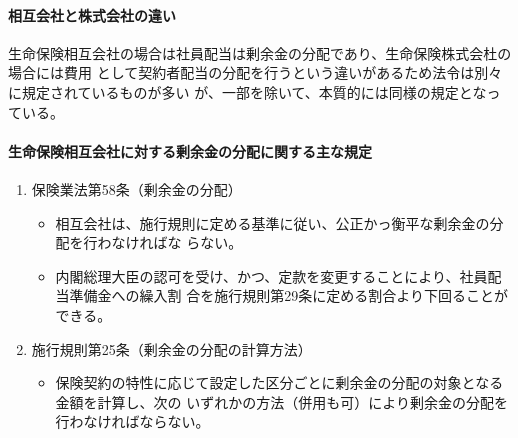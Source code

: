 \documentclass[report,gutter=10mm,fore-edge=10mm,uplatex,dvipdfmx]{jlreq}
\begin{document}
\paragraph{相互会社と株式会社の違い}
生命保険相互会社の場合は社員配当は剰余金の分配であり、生命保険株式会杜の場合には費用
として契約者配当の分配を行うという違いがあるため法令は別々に規定されているものが多い
が、一部を除いて、本質的には同様の規定となっている。

\paragraph{生命保険相互会社に対する剰余金の分配に関する主な規定}

\begin{enumerate} [＊]
\item 保険業法第58条（剰余金の分配）
\begin{itemize}
 \item 相互会社は、施行規則に定める基準に従い、公正かっ衡平な剰余金の分配を行わなければな
 らない。
\item 内閣総理大臣の認可を受け、かつ、定款を変更することにより、社員配当準備金への繰入割
 合を施行規則第29条に定める割合より下回ることができる。
\end{itemize}
\item 施行規則第25条（剰余金の分配の計算方法）
\begin{itemize}
 \item 保険契約の特性に応じて設定した区分ごとに剰余金の分配の対象となる金額を計算し、次の
 いずれかの方法（併用も可）により剰余金の分配を行わなければならない。


\end{itemize}
\end{enumerate}
\end{document}

